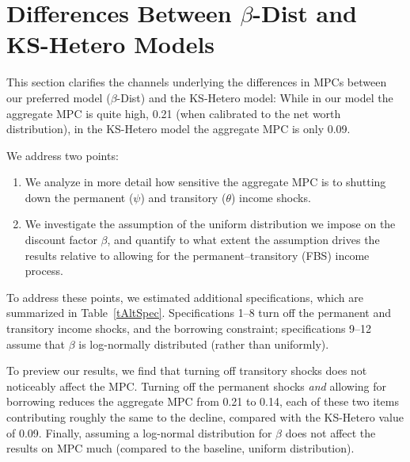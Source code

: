\documentclass[11pt,a4paper,pdftex]{article}\usepackage[pdftex]{graphicx}\usepackage{epstopdf} \usepackage[pdftex]{hyperref}
\begin{document}
\section{Differences Between $\beta$-Dist and KS-Hetero Models}\label{sec:betaDist}


This section clarifies the channels underlying the differences in MPCs between our preferred model ($\beta$-Dist) and the KS-Hetero model: While in our model the aggregate MPC is quite high, 0.21 (when calibrated to the net worth distribution), in the KS-Hetero model the aggregate MPC is only 0.09.

We address two points:
\begin{enumerate}
\item We analyze in more detail how sensitive the aggregate MPC is to shutting down the permanent ($\psi$) and transitory ($\theta$) income shocks.
\item We investigate the assumption of the uniform distribution we impose on the discount factor $\beta$, and quantify to what extent the assumption drives the results relative to allowing for the permanent--transitory (FBS) income process.
\end{enumerate}

To address these points, we estimated additional specifications, which are summarized in Table~\ref{tAltSpec}. Specifications 1--8 turn off the permanent and transitory income shocks, and the borrowing constraint; specifications  9--12 assume that $\beta$ is log-normally distributed (rather than uniformly).

To preview our results, we find that turning off transitory shocks does not noticeably affect the MPC. Turning off the permanent shocks \emph{and} allowing for borrowing reduces the aggregate MPC from 0.21 to 0.14, each of these two items contributing roughly the same to the decline, compared with the KS-Hetero value of 0.09.  Finally, assuming a log-normal distribution for $\beta$ does not affect the results on MPC much (compared to the baseline, uniform distribution).
\end{document}
